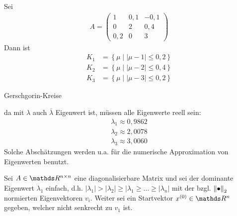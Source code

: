   \begin{Bspe}
    Sei 
    \begin{gather*}
      A=
      \begin{pmatrix}
        1 & 0,1 & -0,1\\
        0 & 2 & 0,4 \\
        0,2 & 0 & 3
      \end{pmatrix}
    \end{gather*}
    Dann ist
    \begin{align*}
      K_1 &= \left\{ \mu \mid |\mu-1|\leq 0,2 \right\} \\
      K_2 &= \left\{ \mu \mid |\mu-2|\leq 0,4 \right\} \\
      K_3 &= \left\{ \mu \mid |\mu-3|\leq 0,2 \right\}
    \end{align*}
    \begin{image}{Gerschgorin-Kreise}
\end{image}
da mit $\lambda$ auch $\overline{\lambda}$ Eigenwert ist,
müssen alle Eigenwerte reell sein:
\begin{align*}
  \lambda_1 \approx 0,9862 \\
  \lambda_2 \approx 2,0078 \\
  \lambda_3 \approx 3,0060
\end{align*}
Solche Abschätzungen werden u.a. für die numerische
Approximation von Eigenwerten benutzt.
\end{Bspe}


\label{8.2.1}
Sei $A\in\R^{n\times n}$ eine 
diagonalisierbare Matrix und 
sei der dominante Eigenwert $\lambda_1$ einfach,
d.h. 
$|\lambda_1|>|\lambda_2|\geq |\lambda_1\geq \ldots\geq |\lambda_n|$
mit der bzgl. $\left\| \bullet \right\|_2$ normierten Eigenvektoren $v_i$.
Weiter sei ein Startvektor $x^{(0)}\in\R^n$ gegeben,
welcher nicht senkrecht zu $v_1$ ist.

